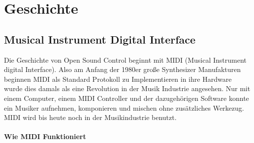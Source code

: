 \documentclass[a4paper, 12pt]{article}
\begin{document}
\maketitle

\newpage
\tableofcontents
\newpage


\section{Geschichte}
\subsection{Musical Instrument Digital Interface}
Die Geschichte von Open Sound Control beginnt mit MIDI (Musical Instrument digital Interface).
Also am Anfang der 1980er große Synthesizer Manufakturen beginnen MIDI als Standard Protokoll zu Implementieren in ihre Hardware wurde dies damals als eine Revolution in der Musik Industrie angesehen. Nur mit einem Computer, einem MIDI Controller und der dazugehörigen Software konnte ein Musiker aufnehmen, komponieren und mischen ohne zusätzliches Werkezug. MIDI wird bis heute noch in der Musikindustrie benutzt.
\paragraph{Wie MIDI Funktioniert}
\end{document}
